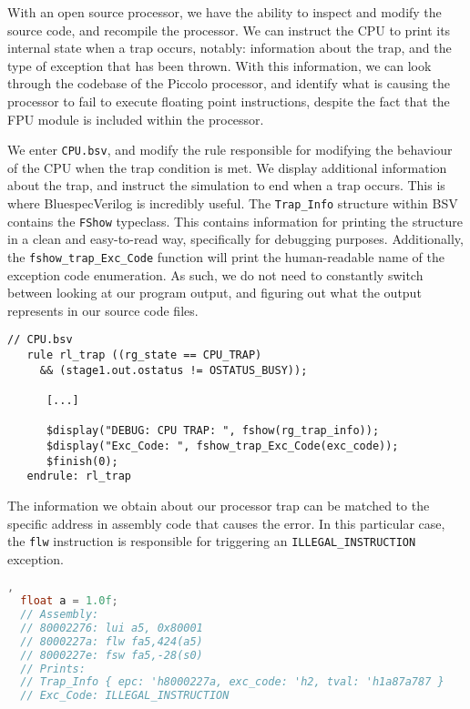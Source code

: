 \documentclass[a4paper,8pt]{report}
\begin{document}
With an open source processor, we have the ability to inspect and modify the
source code, and recompile the processor. We can instruct the CPU to print its
internal state when a trap occurs, notably: information about the trap, and the
type of exception that has been thrown. With this information, we can look
through the codebase of the Piccolo processor, and identify what is causing the
processor to fail to execute floating point instructions, despite the fact that
the FPU module is included within the processor.

We enter \texttt{CPU.bsv}, and modify the rule responsible for modifying the
behaviour of the CPU when the trap condition is met. We display additional
information about the trap, and instruct the simulation to end when a trap
occurs. This is where BluespecVerilog is incredibly useful. The
\texttt{Trap\_Info} structure within BSV contains the \texttt{FShow} typeclass.
This contains information for printing the structure in a clean and easy-to-read
way, specifically for debugging purposes. Additionally, the
\texttt{fshow\_trap\_Exc\_Code} function will print the human-readable name of
the exception code enumeration. As such, we do not need to constantly switch
between looking at our program output, and figuring out what the output
represents in our source code files.

\begin{verbatim}
// CPU.bsv
   rule rl_trap ((rg_state == CPU_TRAP)
     && (stage1.out.ostatus != OSTATUS_BUSY));

      [...]

      $display("DEBUG: CPU TRAP: ", fshow(rg_trap_info));
      $display("Exc_Code: ", fshow_trap_Exc_Code(exc_code));
      $finish(0);
   endrule: rl_trap
\end{verbatim}

The information we obtain about our processor trap can be matched to the
specific address in assembly code that causes the error. In this particular
case, the \texttt{flw} instruction is responsible for triggering an
\texttt{ILLEGAL\_INSTRUCTION} exception.
\begin{lstlisting}[language=C,style=customc],
  float a = 1.0f;
  // Assembly:
  // 80002276: lui a5, 0x80001
  // 8000227a: flw fa5,424(a5)
  // 8000227e: fsw fa5,-28(s0)
  // Prints:
  // Trap_Info { epc: 'h8000227a, exc_code: 'h2, tval: 'h1a87a787 }
  // Exc_Code: ILLEGAL_INSTRUCTION
\end{lstlisting}
\end{document}
